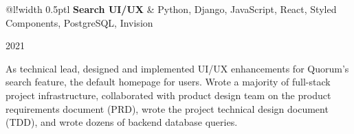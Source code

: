 \documentclass[]{article}
\newcommand\VRule{\color{lightgray}\vrule width 0.5pt}
\begin{document}

\begin{tabular}{@{}l!{\VRule}l}
	{\bf Search UI/UX} & Python, Django, JavaScript, React, Styled Components, PostgreSQL, Invision\\
\end{tabular}\hfill{\footnotesize 2021}

As technical lead, designed and implemented UI/UX enhancements for Quorum’s search feature, the default homepage for users. Wrote a majority of full-stack project infrastructure, collaborated with product design team on the product requirements document (PRD), wrote the project technical design document (TDD), and wrote dozens of backend database queries.\\

\end{document}
